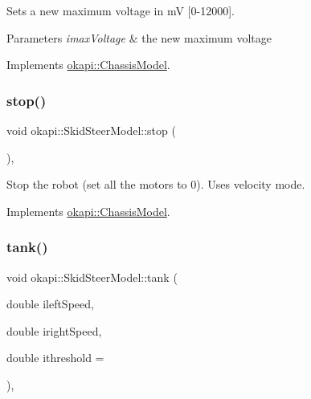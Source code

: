 Sets a new maximum voltage in mV \mbox{[}0-\/12000\mbox{]}.


\begin{DoxyParams}{Parameters}
{\em imax\+Voltage} & the new maximum voltage \\
\hline
\end{DoxyParams}


Implements \mbox{\hyperlink{classokapi_1_1ChassisModel_a2fb261636b79e118f22530cc3fce4f41}{okapi\+::\+Chassis\+Model}}.

\mbox{\label{classokapi_1_1SkidSteerModel_a98d212cff8bad647ada6bcd3054c7581}} 
\subsubsection{\texorpdfstring{stop()}{stop()}}
{\footnotesize\ttfamily void okapi\+::\+Skid\+Steer\+Model\+::stop (\begin{DoxyParamCaption}{ }\end{DoxyParamCaption})\hspace{0.3cm}{\ttfamily [override]}, {\ttfamily [virtual]}}

Stop the robot (set all the motors to 0). Uses velocity mode. 

Implements \mbox{\hyperlink{classokapi_1_1ChassisModel_ad67ad9abae41c5441c2a2d671d0c8a55}{okapi\+::\+Chassis\+Model}}.

\mbox{\label{classokapi_1_1SkidSteerModel_aa51195896f1be6afe661d5c9a8e6ea4e}} 
\subsubsection{\texorpdfstring{tank()}{tank()}}
{\footnotesize\ttfamily void okapi\+::\+Skid\+Steer\+Model\+::tank (\begin{DoxyParamCaption}\item[{double}]{ileft\+Speed,  }\item[{double}]{iright\+Speed,  }\item[{double}]{ithreshold = {} }\end{DoxyParamCaption})\hspace{0.3cm}{\ttfamily [override]}, {\ttfamily [virtual]}}

